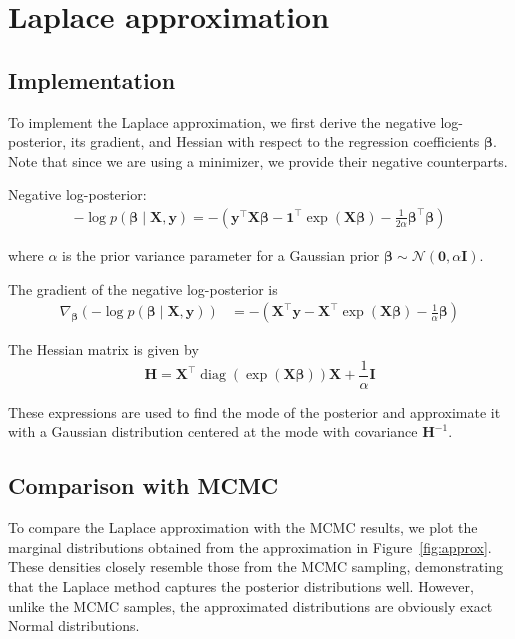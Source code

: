 \documentclass[9pt]{IEEEtran}
\begin{document}
\section{Laplace approximation}
\subsection{Implementation}
To implement the Laplace approximation, we 
first derive the negative log-posterior, its gradient,
 and Hessian with respect to the regression coefficients
  \(\boldsymbol{\beta}\). Note that since we are using a minimizer, we provide
  their negative counterparts.

Negative log-posterior: 
\begin{align}
-\log p(\boldsymbol{\beta} \mid \mathbf{X}, \mathbf{y}) 
= - \left( \mathbf{y}^\top \mathbf{X}\boldsymbol{\beta} - \mathbf{1}^\top \exp(\mathbf{X}\boldsymbol{\beta}) - \frac{1}{2\alpha} \boldsymbol{\beta}^\top \boldsymbol{\beta} \right)
\end{align}

\noindent where \(\alpha\) is the prior variance parameter for a Gaussian prior \(\boldsymbol{\beta} \sim \mathcal{N}(\mathbf{0}, \alpha \mathbf{I})\).

\vspace{1em}

\noindent The gradient of the negative log-posterior is
\begin{align}
\nabla_{\boldsymbol{\beta}} \left( -\log p(\boldsymbol{\beta} \mid \mathbf{X}, \mathbf{y}) \right) 
&= - \left( \mathbf{X}^\top \mathbf{y} - \mathbf{X}^\top \exp(\mathbf{X}\boldsymbol{\beta}) - \frac{1}{\alpha} \boldsymbol{\beta} \right)
\end{align}

\noindent The Hessian matrix is given by
\[
\mathbf{H} = \mathbf{X}^\top \operatorname{diag}\left(\exp(\mathbf{X}\boldsymbol{\beta})\right) \mathbf{X} + \frac{1}{\alpha} \mathbf{I}
\]

\vspace{1em}

These expressions are used to find the mode of the posterior
 and approximate it with a Gaussian distribution centered at 
 the mode with covariance \(\mathbf{H}^{-1}\).

\subsection{Comparison with MCMC}
To compare the Laplace approximation with the MCMC results, we plot
 the marginal distributions obtained from the approximation in 
 Figure~\ref{fig:approx}. These densities closely resemble those 
 from the MCMC sampling, demonstrating that the Laplace method 
 captures the posterior distributions well. However, unlike the
  MCMC samples, the approximated distributions are obviously exact Normal
   distributions.
\end{document}
